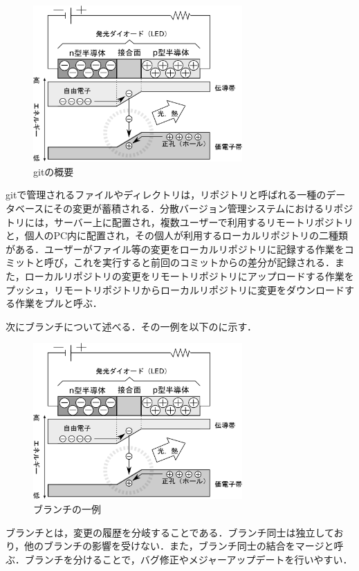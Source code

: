 \documentclass[a4paper,10pt,twocolumn]{jsarticle}
\begin{document}
\begin{figure}[h]
\centering
\includegraphics[width=80mm]{img/function.eps}
\caption{gitの概要}
\label{git}
\end{figure}

gitで管理されるファイルやディレクトリは，リポジトリと呼ばれる一種のデータベースにその変更が蓄積される．分散バージョン管理システムにおけるリポジトリには，サーバー上に配置され，複数ユーザーで利用するリモートリポジトリと，個人のPC内に配置され，その個人が利用するローカルリポジトリの二種類がある．ユーザーがファイル等の変更をローカルリポジトリに記録する作業をコミットと呼び，これを実行すると前回のコミットからの差分が記録される．また，ローカルリポジトリの変更をリモートリポジトリにアップロードする作業をプッシュ，リモートリポジトリからローカルリポジトリに変更をダウンロードする作業をプルと呼ぶ．

次にブランチについて述べる．その一例を以下のに示す．

\begin{figure}[h]
\centering
\includegraphics[width=80mm]{img/function.eps}
\caption{ブランチの一例}
\label{branch}
\end{figure}

ブランチとは，変更の履歴を分岐することである．ブランチ同士は独立しており，他のブランチの影響を受けない．また，ブランチ同士の結合をマージと呼ぶ．ブランチを分けることで，バグ修正やメジャーアップデートを行いやすい．
\end{document}
